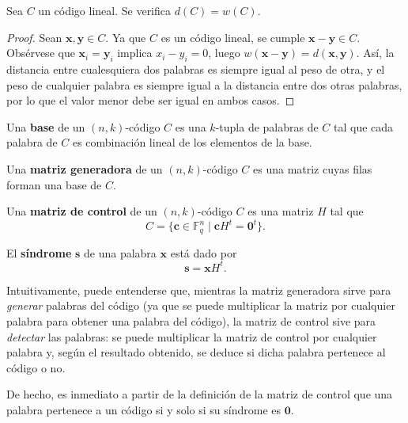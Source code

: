 \begin{theorem}
	Sea $C$ un código lineal. Se verifica $d(C) = w(C)$.
\end{theorem}

\begin{proof}
	Sean $\textbf{x}, \textbf{y} \in C$. Ya que $C$ es un código lineal, se cumple $\textbf{x} - \textbf{y} \in C$. Obsérvese que $\textbf{x}_i = \textbf{y}_i$ implica $x_i - y_i = 0$, luego $w(\textbf{x} - \textbf{y}) = d(\textbf{x}, \textbf{y})$. Así, la distancia entre cualesquiera dos palabras es siempre igual al peso de otra, y el peso de cualquier palabra es siempre igual a la distancia entre dos otras palabras, por lo que el valor menor debe ser igual en ambos casos.
\end{proof}

\begin{definition}
	Una \textbf{base} de un $(n, k)$-código $C$ es una $k$-tupla de palabras de $C$ tal que cada palabra de $C$ es combinación lineal de los elementos de la base.
\end{definition}

\begin{definition}
	Una \textbf{matriz generadora} de un $(n, k)$-código $C$ es una matriz cuyas filas forman una base de $C$.
\end{definition}

\begin{definition}
	Una \textbf{matriz de control} de un $(n, k)$-código $C$ es una matriz $H$ tal que
	\[C = \{\textbf{c} \in \mathbb{F}_q^n \mid \textbf{c}H^t = \textbf{0}^t\}.\]
\end{definition}

\begin{definition}
	El \textbf{síndrome} $\textbf{s}$ de una palabra $\textbf{x}$ está dado por
	\[
		\textbf{s} = \textbf{x}H^t.
	\]
\end{definition}

Intuitivamente, puede entenderse que, mientras la matriz generadora sirve para \textit{generar} palabras del código (ya que se puede multiplicar la matriz por cualquier palabra para obtener una palabra del código), la matriz de control sive para \textit{detectar} las palabras: se puede multiplicar la matriz de control por cualquier palabra y, según el resultado obtenido, se deduce si dicha palabra pertenece al código o no.

De hecho, es inmediato a partir de la definición de la matriz de control que una palabra pertenece a un código si y solo si su síndrome es $\textbf{0}$.

